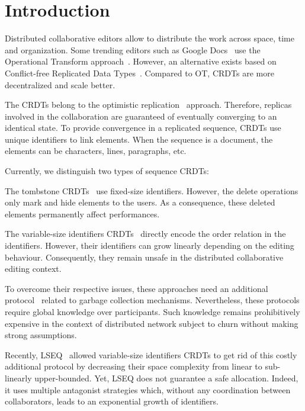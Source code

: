 
\section{Introduction}

Distributed collaborative editors allow to distribute the work across space,
time and organization. Some trending editors such as Google
Docs~\cite{nichols1995high} use the Operational Transform
approach~\cite{sun1998operational,sun1998achieving}. However, an alternative
exists based on Conflict-free Replicated Data
Types~\cite{shapiro2011comprehensive,shapiro2011conflict}.  Compared to OT,
CRDTs are more decentralized and scale better.

The CRDTs belong to the optimistic
replication~\cite{saito2002replication,saito2005optimistic}
approach. Therefore, replicas involved in the collaboration are guaranteed of
eventually converging to an identical state. To provide convergence in a
replicated sequence, CRDTs use unique identifiers to link elements. When the
sequence is a document, the elements can be characters, lines, paragraphs, etc.


Currently, we distinguish two types of sequence CRDTs:
\begin{inparaenum}[(i)]
\item The tombstone
  CRDTs~\cite{ahmed2011evaluating,grishchenko2010deep,oster2006data,preguica2009commutative,roh2011replicated,weiss2007wooki,Yu2012stringwise}
  use fixed-size identifiers. However, the delete operations only mark and hide
  elements to the users. As a consequence, these deleted elements permanently
  affect performances.
\item The variable-size identifiers
  CRDTs~\cite{preguica2009commutative,weiss2009logoot} directly encode the
  order relation in the identifiers. However, their identifiers can grow
  linearly depending on the editing behaviour. Consequently, they remain unsafe
  in the distributed collaborative editing context.
\end{inparaenum}

To overcome their respective issues, these approaches need an additional
protocol~\cite{letia2009crdts,roh2011replicated} related to garbage collection
mechanisms. Nevertheless, these protocols require global knowledge over
participants. Such knowledge remains prohibitively expensive in the context of
distributed network subject to churn without making strong assumptions.

Recently, LSEQ~\cite{nedelec2013lseq} allowed variable-size identifiers CRDTs
to get rid of this costly additional protocol by decreasing their space
complexity from linear to sub-linearly upper-bounded. Yet, LSEQ does not
guarantee a safe allocation. Indeed, it uses multiple antagonist strategies
which, without any coordination between collaborators, leads to an exponential
growth of identifiers.

